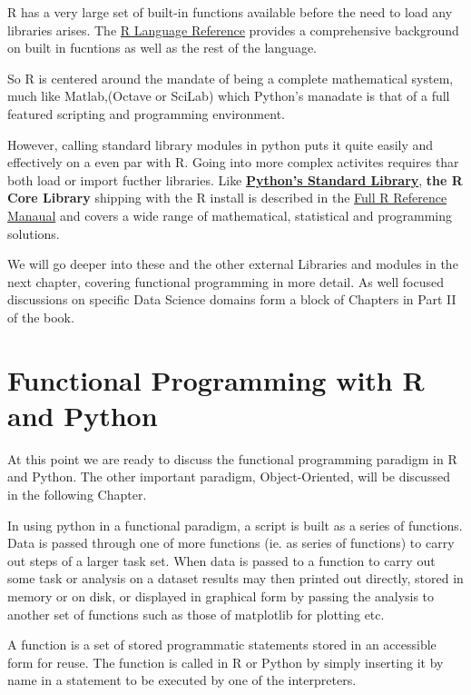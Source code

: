 \documentclass[]{book}
\theoremstyle{definition}
\theoremstyle{definition}
\theoremstyle{definition}
\theoremstyle{remark}
\begin{document}
R has a very large set of built-in functions available before the need
to load any libraries arises. The
\href{https://cran.r-project.org/doc/manuals/r-release/R-lang.html}{R
Language Reference} provides a comprehensive background on built in
fucntions as well as the rest of the language.

So R is centered around the mandate of being a complete mathematical
system, much like Matlab,(Octave or SciLab) which Python's manadate is
that of a full featured scripting and programming environment.

However, calling standard library modules in python puts it quite easily
and effectively on a even par with R. Going into more complex activites
requires thar both load or import fucther libraries. Like
\href{https://docs.python.org/3/library/index.html}{\textbf{Python's
Standard Library}}, \textbf{the R Core Library} shipping with the R
install is described in the
\href{https://cran.r-project.org/doc/manuals/r-release/fullrefman.pdf}{Full
R Reference Manaual} and covers a wide range of mathematical,
statistical and programming solutions.

We will go deeper into these and the other external Libraries and
modules in the next chapter, covering functional programming in more
detail. As well focused discussions on specific Data Science domains
form a block of Chapters in Part II of the book.

\chapter{Functional Programming with R and
Python}\label{functional-programming-with-r-and-python}

At this point we are ready to discuss the functional programming
paradigm in R and Python. The other important paradigm, Object-Oriented,
will be discussed in the following Chapter.

In using python in a functional paradigm, a script is built as a series
of functions. Data is passed through one of more functions (ie. as
series of functions) to carry out steps of a larger task set. When data
is passed to a function to carry out some task or analysis on a dataset
results may then printed out directly, stored in memory or on disk, or
displayed in graphical form by passing the analysis to another set of
functions such as those of matplotlib for plotting etc.

A function is a set of stored programmatic statements stored in an
accessible form for reuse. The function is called in R or Python by
simply inserting it by name in a statement to be executed by one of the
interpreters.
\end{document}
